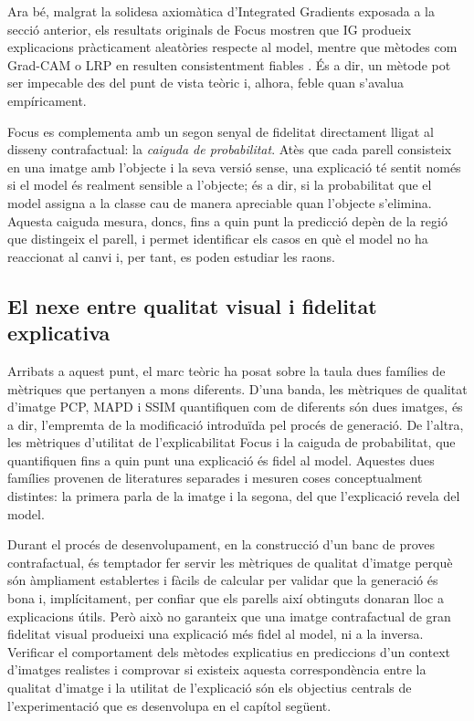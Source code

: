 Ara bé, malgrat la solidesa axiomàtica d'Integrated Gradients exposada a la secció anterior, els resultats originals de Focus mostren que \ac{IG} produeix explicacions pràcticament aleatòries respecte al model, mentre que mètodes com Grad-CAM o LRP en resulten consistentment fiables \cite{Ariasduart2022}. És a dir, un mètode pot ser impecable des del punt de vista teòric i, alhora, feble quan s'avalua empíricament.

Focus es complementa amb un segon senyal de fidelitat directament lligat al disseny contrafactual: la \emph{caiguda de probabilitat}. Atès que cada parell consisteix en una imatge amb l'objecte i la seva versió sense, una explicació té sentit només si el model és realment sensible a l'objecte; és a dir, si la probabilitat que el model assigna a la classe cau de manera apreciable quan l'objecte s'elimina. Aquesta caiguda mesura, doncs, fins a quin punt la predicció depèn de la regió que distingeix el parell, i permet identificar els casos en què el model no ha reaccionat al canvi i, per tant, es poden estudiar les raons.

\subsection{El nexe entre qualitat visual i fidelitat explicativa}
Arribats a aquest punt, el marc teòric ha posat sobre la taula dues famílies de mètriques que pertanyen a mons diferents. D'una banda, les mètriques de qualitat d'imatge \ac{PCP}, \ac{MAPD} i \ac{SSIM} quantifiquen com de diferents són dues imatges, és a dir, l'empremta de la modificació introduïda pel procés de generació. De l'altra, les mètriques d'utilitat de l'explicabilitat Focus i la caiguda de probabilitat, que quantifiquen fins a quin punt una explicació és fidel al model. Aquestes dues famílies provenen de literatures separades i mesuren coses conceptualment distintes: la primera parla de la imatge i la segona, del que l'explicació revela del model.

Durant el procés de desenvolupament, en la construcció d'un banc de proves contrafactual, és temptador fer servir les mètriques de qualitat d'imatge perquè són àmpliament establertes i fàcils de calcular per validar que la generació és bona i, implícitament, per confiar que els parells així obtinguts donaran lloc a explicacions útils. Però això no garanteix que una imatge contrafactual de gran fidelitat visual produeixi una explicació més fidel al model, ni a la inversa. Verificar el comportament dels mètodes explicatius en prediccions d'un context d'imatges realistes i comprovar si existeix aquesta correspondència entre la qualitat d'imatge i la utilitat de l'explicació són els objectius centrals de l'experimentació que es desenvolupa en el capítol següent.